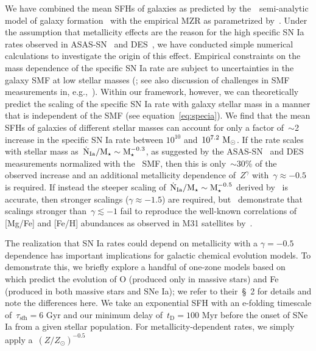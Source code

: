 \documentclass[ms.tex]{subfiles}
\begin{document}
We have combined the mean SFHs of galaxies as predicted by the~\um~semi-analytic
model of galaxy formation~\citep{Behroozi2019} with the empirical MZR as
parametrized by~\citet{Zahid2014}.
Under the assumption that metallicity effects are the reason for the high
specific SN Ia rates observed in ASAS-SN~\citep{Brown2019} and
DES~\citep{Wiseman2021}, we have conducted simple numerical calculations to
investigate the origin of this effect.
Empirical constraints on the mass dependence of the specific SN Ia rate are
subject to uncertainties in the galaxy SMF at low stellar masses
(\citealp{Gandhi2022}; see also discussion of challenges in SMF measurements
in, e.g.,~\citealp{Weigel2016}).
Within our framework, however, we can theoretically predict the scaling of the
specific SN Ia rate with galaxy stellar mass in a manner that is independent of
the SMF (see equation~\ref{eq:specia}).
We find that the mean SFHs of galaxies of different stellar masses can account
for only a factor of~$\sim$2 increase in the specific SN Ia rate between
$10^{10}$ and~$10^{7.2}~\text{M}_\odot$.
If the rate scales with stellar mass as~$\dot{\text{N}}_\text{Ia} / \text{M}_\star \sim
\text{M}_\star^{-0.3}$, as suggested by the ASAS-SN~\citep{Brown2019} and DES
\citep{Wiseman2021} measurements normalized with the~\citet{Baldry2012} SMF,
then this is only~$\sim$30\% of the observed increase and an additional
metallicity dependence of~$Z^\gamma$ with~$\gamma \approx -0.5$ is required.
If instead the steeper scaling of~$\dot{\text{N}}_\text{Ia} / \text{M}_\star \sim
\text{M}_\star^{-0.5}$ derived by~\citet{Brown2019} is accurate, then stronger
scalings ($\gamma \approx -1.5$) are required, but~\citet{Gandhi2022}
demonstrate that scalings stronger than~$\gamma \lesssim -1$ fail to reproduce
the well-known correlations of [Mg/Fe] and [Fe/H] abundances as observed in M31
satellites by~\citet*{Vargas2014}.
\par
The realization that SN Ia rates could depend on metallicity with a
$\gamma = -0.5$ dependence has important implications for galactic chemical
evolution models.
To demonstrate this, we briefly explore a handful of one-zone models based
on~\citet{Johnson2020} which predict the evolution of O (produced only in
massive stars) and Fe (produced in both massive stars and SNe Ia); we refer
to their~\S~2 for details and note the differences here.
We take an exponential SFH with an e-folding timescale of~$\tau_\text{sfh} = 6$
Gyr and our minimum delay of~$t_\text{D} = 100$ Myr before the onset of SNe Ia
from a given stellar population.
For metallicity-dependent rates, we simply apply a~$(Z / Z_\odot)^{-0.5}$
\end{document}
